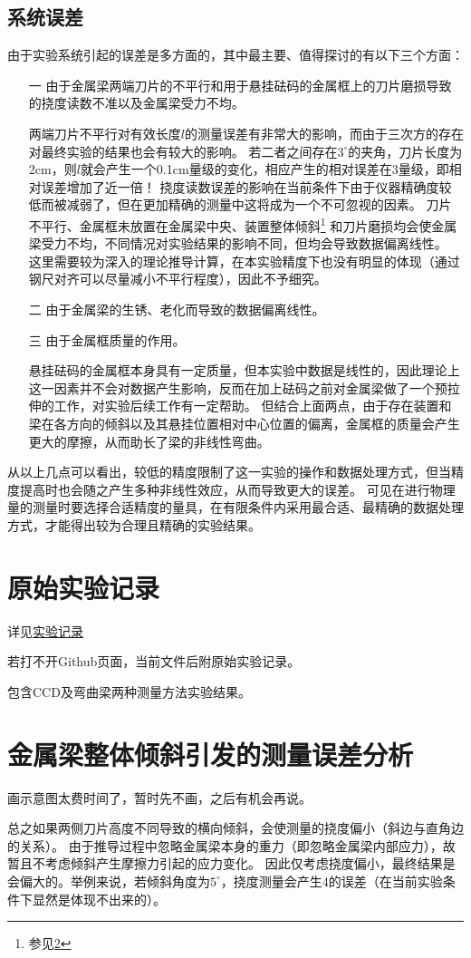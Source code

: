 \documentclass[12pt, a4paper]{ctexart}
\begin{document}
\subsection{系统误差}
由于实验系统引起的误差是多方面的，其中最主要、值得探讨的有以下三个方面：
\begin{enumerate}
    \item[一] 由于金属梁两端刀片的不平行和用于悬挂砝码的金属框上的刀片磨损导致的挠度读数不准以及金属梁受力不均。
    
    两端刀片不平行对有效长度$l$的测量误差有非常大的影响，而由于三次方的存在对最终实验的结果也会有较大的影响。
    若二者之间存在$3^{\circ}$的夹角，刀片长度为2cm，则$l$就会产生一个0.1cm量级的变化，相应产生的相对误差在3\textperthousand 量级，即相对误差增加了近一倍！
    挠度读数误差的影响在当前条件下由于仪器精确度较低而被减弱了，但在更加精确的测量中这将成为一个不可忽视的因素。
    刀片不平行、金属框未放置在金属梁中央、装置整体倾斜\footnote{参见\ref{appendix:附录B}} 和刀片磨损均会使金属梁受力不均，不同情况对实验结果的影响不同，但均会导致数据偏离线性。
    这里需要较为深入的理论推导计算，在本实验精度下也没有明显的体现（通过钢尺对齐可以尽量减小不平行程度），因此不予细究。
    \item[二] 由于金属梁的生锈、老化而导致的数据偏离线性。
    \item[三] 由于金属框质量的作用。
    
    悬挂砝码的金属框本身具有一定质量，但本实验中数据是线性的，因此理论上这一因素并不会对数据产生影响，反而在加上砝码之前对金属梁做了一个预拉伸的工作，对实验后续工作有一定帮助。
    但结合上面两点，由于存在装置和梁在各方向的倾斜以及其悬挂位置相对中心位置的偏离，金属框的质量会产生更大的摩擦，从而助长了梁的非线性弯曲。
\end{enumerate}

从以上几点可以看出，较低的精度限制了这一实验的操作和数据处理方式，但当精度提高时也会随之产生多种非线性效应，从而导致更大的误差。
可见在进行物理量的测量时要选择合适精度的量具，在有限条件内采用最合适、最精确的数据处理方式，才能得出较为合理且精确的实验结果。

\appendix
\section{原始实验记录}
详见\href{https://github.com/oFtangcY/experiment-I/blob/main/1.8%E6%9D%A8%E6%B0%8F%E6%A8%A1%E9%87%8F/origin%20data.pdf}{实验记录}

若打不开Github页面，当前文件后附原始实验记录。

包含CCD及弯曲梁两种测量方法实验结果。

\section{金属梁整体倾斜引发的测量误差分析}
\label{appendix:附录B}
画示意图太费时间了，暂时先不画，之后有机会再说。

总之如果两侧刀片高度不同导致的横向倾斜，会使测量的挠度偏小（斜边与直角边的关系）。
由于推导过程中忽略金属梁本身的重力（即忽略金属梁内部应力），故暂且不考虑倾斜产生摩擦力引起的应力变化。
因此仅考虑挠度偏小，最终结果是会偏大的。举例来说，若倾斜角度为$5^\circ$，挠度测量会产生4\textperthousand 的误差（在当前实验条件下显然是体现不出来的）。
\end{document}
